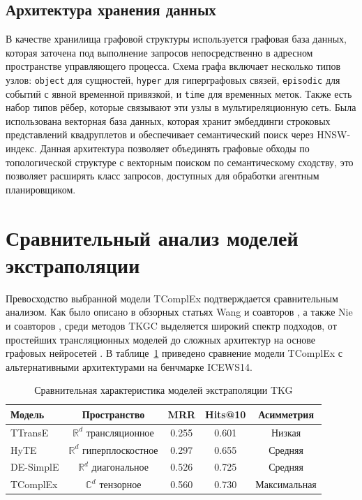 \subsection{Архитектура хранения данных}

В качестве хранилища графовой структуры используется графовая база данных, которая заточена под выполнение запросов непосредственно в адресном пространстве управляющего процесса. Схема графа включает несколько типов узлов: \texttt{object} для сущностей, \texttt{hyper} для гиперграфовых связей, \texttt{episodic} для событий с явной временной привязкой, и \texttt{time} для временных меток. Также есть набор типов рёбер, которые связывают эти узлы в мультиреляционную сеть. Была использована векторная база данных, которая хранит эмбеддинги строковых представлений квадруплетов и обеспечивает семантический поиск через HNSW-индекс. Данная архитектура позволяет объединять графовые обходы по топологической структуре с векторным поиском по семантическому сходству, это позволяет расширять класс запросов, доступных для обработки агентным планировщиком.


\section{Сравнительный анализ моделей экстраполяции}
\label{sec:comparison}

Превосходство выбранной модели TComplEx подтверждается сравнительным анализом. Как было описано в обзорных статьях Wang и соавторов \cite{ref71}, а также Nie и соавторов \cite{ref74}, среди методов TKGC выделяется широкий спектр подходов, от простейших трансляционных моделей до сложных архитектур на основе графовых нейросетей \cite{ref76}. В таблице~\ref{tab:models_comparison} приведено сравнение модели TComplEx с альтернативными архитектурами на бенчмарке ICEWS14.

\begin{table}[htbp]
\caption{Сравнительная характеристика моделей экстраполяции TKG}
\label{tab:models_comparison}
\centering
\begin{tabular}{lcccc}
\hline
Модель & Пространство & MRR & Hits@10 & Асимметрия \\
\hline
TTransE & $\displaystyle \mathbb{R}^d$ трансляционное & 0.255 & 0.601 & Низкая \\
HyTE & $\displaystyle \mathbb{R}^d$ гиперплоскостное & 0.297 & 0.655 & Средняя \\
DE-SimplE & $\displaystyle \mathbb{R}^d$ диагональное & 0.526 & 0.725 & Средняя \\
TComplEx & $\displaystyle \mathbb{C}^d$ тензорное & 0.560 & 0.730 & Максимальная \\
\hline
\end{tabular}
\end{table}

